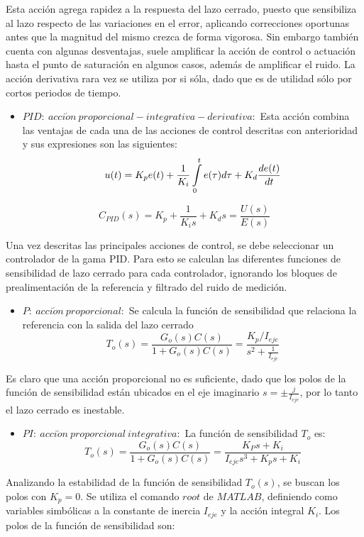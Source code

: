 \documentclass[../main.tex]{subfiles}
\begin{document}
Esta acción agrega rapidez a la respuesta del lazo cerrado, puesto
que sensibiliza al lazo respecto de las variaciones en el error, aplicando
correcciones oportunas antes que la magnitud del mismo crezca de forma
vigorosa. Sin embargo también cuenta con algunas desventajas, suele
amplificar la acción de control o actuación hasta el punto de saturación
en algunos casos, además de amplificar el ruido. La acción derivativa
rara vez se utiliza por si sóla, dado que es de utilidad sólo por
cortos periodos de tiempo. 
\begin{itemize}
\item $PID:\ acci\acute{o}n\ proporcional-integrativa-derivativa:$ Esta
acción combina las ventajas de cada una de las acciones de control
descritas con anterioridad y sus expresiones son las siguientes:
\[
u(t)=K_{p}e(t)+\frac{1}{K_{i}}\intop_{0}^{t}e(\tau)d\tau+K_{d}\frac{de(t)}{dt}
\]
\end{itemize}
\[
C_{PID}(s)=K_{p}+\frac{1}{K_{i}s}+K_{d}s=\frac{U(s)}{E(s)}
\]

Una vez descritas las principales acciones de control, se debe seleccionar
un controlador de la gama PID. Para esto se calculan las diferentes
funciones de sensibilidad de lazo cerrado para cada controlador, ignorando
los bloques de prealimentación de la referencia y filtrado del ruido
de medición.
\begin{itemize}
\item $P:\ acci\acute{o}n\ proporcional:$ Se calcula la función de sensibilidad
que relaciona la referencia con la salida del lazo cerrado
\[
T_{o}(s)=\frac{G_{o}(s)C(s)}{1+G_{o}(s)C(s)}=\frac{K_{p}/I_{eje}}{s^{2}+\frac{1}{I_{eje}}}
\]
\end{itemize}

Es claro que una acción proporcional no es suficiente, dado que los
polos de la función de sensibilidad están ubicados en el eje imaginario
$s=\pm\frac{j}{I_{eje}}$, por lo tanto el lazo cerrado es inestable.

\begin{itemize}
\item $PI:\ acci\acute{o}n\ proporcional\ integrativa:$ La función de sensibilidad
$T_{o}$ es:
\[
T_{o}(s)=\frac{G_{o}(s)C(s)}{1+G_{o}(s)C(s)}=\frac{K_{P}s+K_{i}}{I_{eje}s^{3}+K_{p}s+K_{i}}
\]
\end{itemize}

Analizando la estabilidad de la función de sensibilidad $T_{o}(s)$,
se buscan los polos con $K_{p}=0.$ Se utiliza el comando $root$
de $MATLAB$, definiendo como variables simbólicas a la constante
de inercia $I_{eje}$ y la acción integral $K_{i}$. Los polos de
la función de sensibilidad son:
\end{document}
